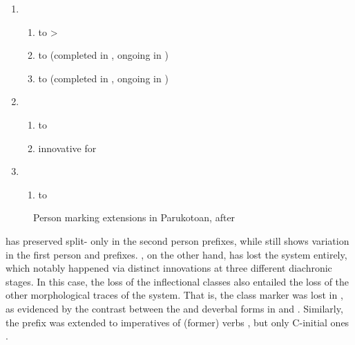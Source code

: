 \begin{enumerate}
\item \PPar \begin{enumerate}
	\item {}  to >
	\item {}  to  (completed in \PWai, ongoing in \kaxui)
	\item {}  to  (completed in \PWai, ongoing in \kaxui)
\end{enumerate}
\item \PWai \begin{enumerate}
\item {}  to 
\item innovative   for 
\end{enumerate}
\item \waiwai \begin{enumerate}
\item {}  to \end{enumerate}
\end{enumerate}

\begin{figure}[hbt]
\centering
\setlength{\tabcolsep}{2pt}
  \caption{Person marking extensions in Parukotoan, after \textcite[94]{gildea1998}}
  \label{fig:par_ext}
\end{figure}

\hixka has preserved split- only in the second person prefixes, while \kaxui still shows variation in the first person and  prefixes.
\waiwai, on the other hand, has lost the system entirely, which notably happened via distinct innovations at three different diachronic stages.
In this case, the loss of the inflectional classes also entailed the loss of the other morphological traces of the system.
That is, the  class marker   was lost in \waiwai, as evidenced by the contrast between the \waiwai and \kaxui deverbal forms in  and .
Similarly, the  prefix  was extended to imperatives of (former)  verbs , but only C-initial ones \parencite[62]{waiwaihawkins1998}.

